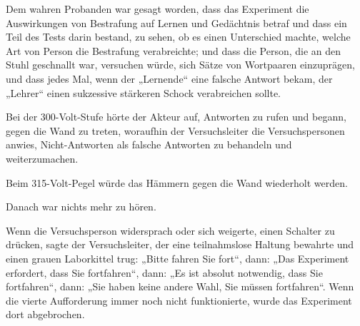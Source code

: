 Dem wahren Probanden war gesagt worden, dass das Experiment die Auswirkungen von Bestrafung auf Lernen und Gedächtnis betraf und dass ein Teil des Tests darin bestand, zu sehen, ob es einen Unterschied machte, welche Art von Person die Bestrafung verabreichte; und dass die Person, die an den Stuhl geschnallt war, versuchen würde, sich Sätze von Wortpaaren einzuprägen, und dass jedes Mal, wenn der „Lernende“ eine falsche Antwort bekam, der „Lehrer“ einen sukzessive stärkeren Schock verabreichen sollte.

Bei der 300-Volt-Stufe hörte der Akteur auf, Antworten zu rufen und begann, gegen die Wand zu treten, woraufhin der Versuchsleiter die Versuchspersonen anwies, Nicht-Antworten als falsche Antworten zu behandeln und weiterzumachen.

Beim 315-Volt-Pegel würde das Hämmern gegen die Wand wiederholt werden.

Danach war nichts mehr zu hören.

Wenn die Versuchsperson widersprach oder sich weigerte, einen Schalter zu drücken, sagte der Versuchsleiter, der eine teilnahmslose Haltung bewahrte und einen grauen Laborkittel trug: „Bitte fahren Sie fort“, dann: „Das Experiment erfordert, dass Sie fortfahren“, dann: „Es ist absolut notwendig, dass Sie fortfahren“, dann: „Sie haben keine andere Wahl, Sie müssen fortfahren“. Wenn die vierte Aufforderung immer noch nicht funktionierte, wurde das Experiment dort abgebrochen.

